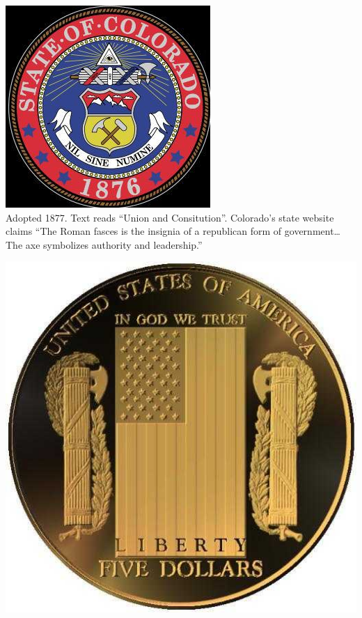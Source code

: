 \begin{frame}
    \centering
    \includegraphics[height=.8\textheight]{img/fasces/fasces13.jpg} \\
    Adopted 1877. Text reads ``Union and Consitution''. Colorado's state website claims ``The Roman fasces is the insignia of a republican form of government\ldots The axe symbolizes authority and leadership.'' \\
\end{frame}
\begin{frame}
    \centering
    \includegraphics[height=.8\textheight]{img/fasces/fasces5coin.jpg} \\
\end{frame}
